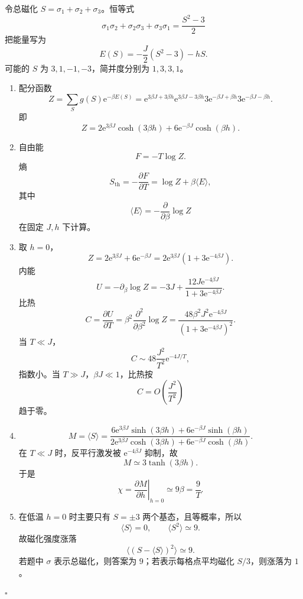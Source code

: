 \documentclass[UTF8,12pt]{ctexart}
\newcommand{\ee}{\mathrm e}
\newenvironment{solution}{%
  \par\medskip
  \noindent{\bfseries 解答}\quad\ignorespaces
}{\hfill$\square$\par\medskip}
\begin{document}
\begin{solution}
令总磁化 \(S=\sigma_1+\sigma_2+\sigma_3\)。恒等式
\[
\sigma_1\sigma_2+\sigma_2\sigma_3+\sigma_3\sigma_1=\frac{S^2-3}{2}
\]
把能量写为
\[
E(S)=-\frac J2(S^2-3)-hS.
\]
可能的 \(S\) 为 \(3,1,-1,-3\)，简并度分别为 \(1,3,3,1\)。
\begin{enumerate}[label=(\arabic*)]
\item 配分函数
\[
Z=\sum_S g(S)\ee^{-\beta E(S)}
=\ee^{3\beta J+3\beta h}
\ee^{3\beta J-3\beta h}
3\ee^{-\beta J+\beta h}
3\ee^{-\beta J-\beta h}.
\]
即
\[
Z=2\ee^{3\beta J}\cosh(3\beta h)
+6\ee^{-\beta J}\cosh(\beta h).
\]

\item 自由能
\[
F=-T\log Z.
\]
熵
\[
S_{\mathrm{th}}=-\frac{\partial F}{\partial T}
=\log Z+\beta\langle E\rangle,
\]
其中
\[
\langle E\rangle=-\frac{\partial}{\partial\beta}\log Z
\]
在固定 \(J,h\) 下计算。

\item 取 \(h=0\)，
\[
Z=2\ee^{3\beta J}+6\ee^{-\beta J}
=2\ee^{3\beta J}(1+3\ee^{-4\beta J}).
\]
内能
\[
U=-\partial_\beta\log Z
=-3J+\frac{12J\ee^{-4\beta J}}{1+3\ee^{-4\beta J}}.
\]
比热
\[
C=\frac{\partial U}{\partial T}
=\beta^2\frac{\partial^2}{\partial\beta^2}\log Z
=\frac{48\beta^2J^2\ee^{-4\beta J}}{(1+3\ee^{-4\beta J})^2}.
\]
当 \(T\ll J\)，
\[
C\sim48\frac{J^2}{T^2}\ee^{-4J/T},
\]
指数小。当 \(T\gg J\)，\(\beta J\ll1\)，比热按
\[
C=O\!\left(\frac{J^2}{T^2}\right)
\]
趋于零。

\item
\[
M=\langle S\rangle
=\frac{6\ee^{3\beta J}\sinh(3\beta h)+6\ee^{-\beta J}\sinh(\beta h)}
{2\ee^{3\beta J}\cosh(3\beta h)+6\ee^{-\beta J}\cosh(\beta h)}.
\]
在 \(T\ll J\) 时，反平行激发被 \(\ee^{-4\beta J}\) 抑制，故
\[
M\simeq 3\tanh(3\beta h).
\]
于是
\[
\chi=\left.\frac{\partial M}{\partial h}\right|_{h=0}
\simeq 9\beta=\frac9T.
\]

\item 在低温 \(h=0\) 时主要只有 \(S=\pm3\) 两个基态，且等概率，所以
\[
\langle S\rangle=0,\qquad
\langle S^2\rangle\simeq9.
\]
故磁化强度涨落
\[
\langle(S-\langle S\rangle)^2\rangle\simeq9.
\]
若题中 \(\sigma\) 表示总磁化，则答案为 \(9\)；若表示每格点平均磁化 \(S/3\)，则涨落为 \(1\)。
\end{enumerate}
\end{solution}
\end{document}
